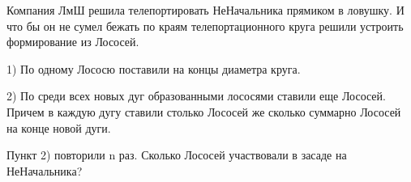 Компания ЛмШ решила телепортировать НеНачальника прямиком в ловушку. И что бы он не сумел бежать по краям телепортационного круга решили устроить формирование из Лососей.

1) По одному Лососю поставили на концы диаметра круга.

2) По среди всех новых дуг образованными лососями ставили еще Лососей. Причем в каждую дугу ставили столько Лососей же сколько суммарно Лососей на конце новой дуги.

Пункт 2) повторили n раз. Сколько Лососей участвовали в засаде на НеНачальника?